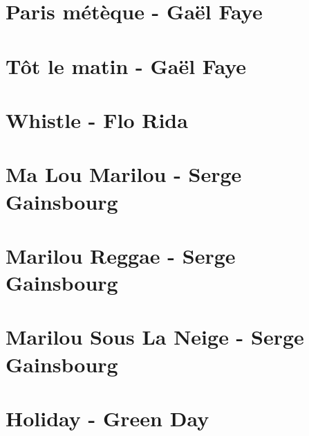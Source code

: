 \documentclass{guitartabs}
\begin{document}
\section{Paris métèque - Gaël Faye}
\begin{guitar}

\end{guitar}


\section{Tôt le matin - Gaël Faye}
\begin{guitar}

\end{guitar}

\section{Whistle - Flo Rida}
\begin{guitar}

\end{guitar}


\section{Ma Lou Marilou - Serge Gainsbourg}
\begin{guitar}

\end{guitar}

\section{Marilou Reggae - Serge Gainsbourg}
\begin{guitar}

\end{guitar}

\section{Marilou Sous La Neige - Serge Gainsbourg}
\begin{guitar}

\end{guitar}

\section*{Holiday - Green Day}
\begin{guitar}

\end{guitar}
\end{document}
